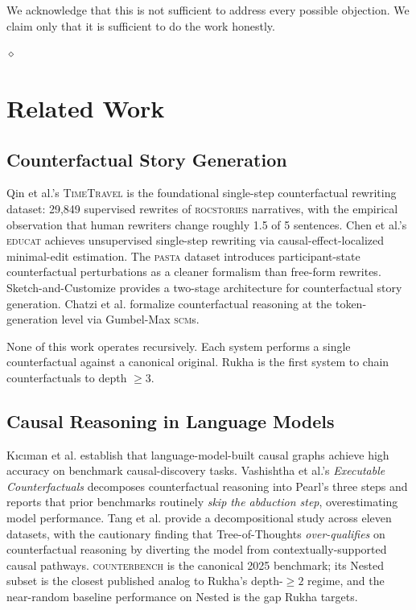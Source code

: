 \documentclass[11pt]{article}
\theoremstyle{rukha}
\newcommand{\diamondrule}{%
  \begin{center}\vspace{0.6em}%
  {\scriptsize $\diamond$}\vspace{0.6em}\end{center}}
\begin{document}
We acknowledge that this is not sufficient to address every possible
objection. We claim only that it is sufficient to do the work
honestly.

\diamondrule

\section{Related Work}

\subsection{Counterfactual Story Generation}

Qin et al.'s \textsc{TimeTravel} \cite{timetravel} is the foundational
single-step counterfactual rewriting dataset: 29,849 supervised rewrites
of \textsc{rocstories} narratives, with the empirical observation that
human rewriters change roughly 1.5 of 5 sentences. Chen et al.'s
\textsc{educat} \cite{educat} achieves unsupervised single-step
rewriting via causal-effect-localized minimal-edit estimation. The
\textsc{pasta} dataset \cite{pasta} introduces participant-state
counterfactual perturbations as a cleaner formalism than free-form
rewrites. Sketch-and-Customize \cite{sketchcustomize} provides a
two-stage architecture for counterfactual story generation. Chatzi et al.
\cite{chatzi} formalize counterfactual reasoning at the
token-generation level via Gumbel-Max \textsc{scm}s.

None of this work operates recursively. Each system performs a single
counterfactual against a canonical original. Rukha is the first system
to chain counterfactuals to depth $\geq 3$.

\subsection{Causal Reasoning in Language Models}

Kıcıman et al. \cite{kiciman} establish that language-model-built causal
graphs achieve high accuracy on benchmark causal-discovery tasks.
Vashishtha et al.'s \emph{Executable Counterfactuals}
\cite{executablecounterfactuals} decomposes counterfactual reasoning
into Pearl's three steps and reports that prior benchmarks routinely
\emph{skip the abduction step}, overestimating model performance.
Tang et al. \cite{tangcounterfactual} provide a decompositional study
across eleven datasets, with the cautionary finding that Tree-of-Thoughts
\emph{over-qualifies} on counterfactual reasoning by diverting the model
from contextually-supported causal pathways. \textsc{counterbench}
\cite{counterbench} is the canonical 2025 benchmark; its Nested subset
is the closest published analog to Rukha's depth-$\geq 2$ regime, and
the near-random baseline performance on Nested is the gap Rukha targets.
\end{document}
